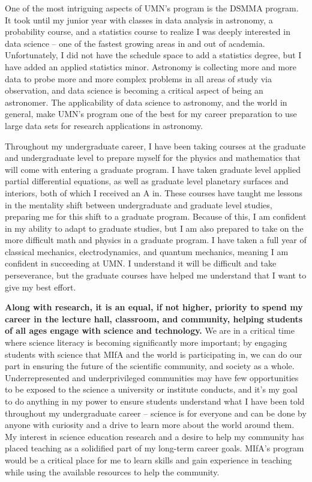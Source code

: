 \documentclass[11pt,letterpaper]{article}
\begin{document}
One of the most intriguing aspects of UMN's program is the DSMMA program. It took until my junior year with classes in data analysis in astronomy, a probability course, and a statistics course to realize I was deeply interested in data science -- one of the fastest growing areas in and out of academia. Unfortunately, I did not have the schedule space to add a statistics degree, but I have added an applied statistics minor. Astronomy is collecting more and more data to probe more and more complex problems in all areas of study via observation, and data science is becoming a critical aspect of being an astronomer. The applicability of data science to astronomy, and the world in general, make UMN's program one of the best for my career preparation to use large data sets for research applications in astronomy.

Throughout my undergraduate career, I have been taking courses at the graduate and undergraduate level to prepare myself for the physics and mathematics that will come with entering a graduate program. I have taken graduate level applied partial differential equations, as well as graduate level planetary surfaces and interiors, both of which I received an A in. These courses have taught me lessons in the mentality shift between undergraduate and graduate level studies, preparing me for this shift to a graduate program. Because of this, I am confident in my ability to adapt to graduate studies, but I am also prepared to take on the more difficult math and physics in a graduate program. I have taken a full year of classical mechanics, electrodynamics, and quantum mechanics, meaning I am confident in succeeding at UMN. I understand it will be difficult and take perseverance, but the graduate courses have helped me understand that I want to give my best effort.

\textbf{Along with research, it is an equal, if not higher, priority to spend my career in the lecture hall, classroom, and community, helping students of all ages engage with science and technology.} We are in a critical time where science literacy is becoming significantly more important; by engaging students with science that MIfA and the world is participating in, we can do our part in ensuring the future of the scientific community, and society as a whole. Underrepresented and underprivileged communities may have few opportunities to be exposed to the science a university or institute conducts, and it’s my goal to do anything in my power to ensure students understand what I have been told throughout my undergraduate career -- science is for everyone and can be done by anyone with curiosity and a drive to learn more about the world around them. My interest in science education research and a desire to help my community has placed teaching as a solidified part of my long-term career goals. MIfA’s program would be a critical place for me to learn skills and gain experience in teaching while using the available resources to help the community.
\end{document}
